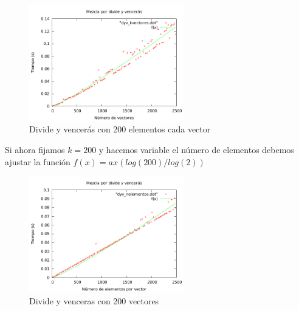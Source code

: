 \begin{center}
\end{center}

\begin{figure}[htb] 
\centering
	\includegraphics[width=0.6\textwidth]{../Obligatorio/Graficas/dyv_kvectores.png}
	\caption{Divide y vencerás con 200 elementos cada vector} 
	\label{fig:d_kvectores} 
\end{figure}

Si ahora fijamos $k=200$ y hacemos variable el n\'umero de elementos debemos ajustar la funci\'on $f(x) = ax(log(200)/log(2))$

\begin{center}
\end{center}

\begin{figure}[htb] 
\centering
	\includegraphics[width=0.6\textwidth]{../Obligatorio/Graficas/dyv_nelementos.png}
	\caption{Divide y venceras con 200 vectores} 
	\label{fig:d_nelementos} 
\end{figure}
\newpage

